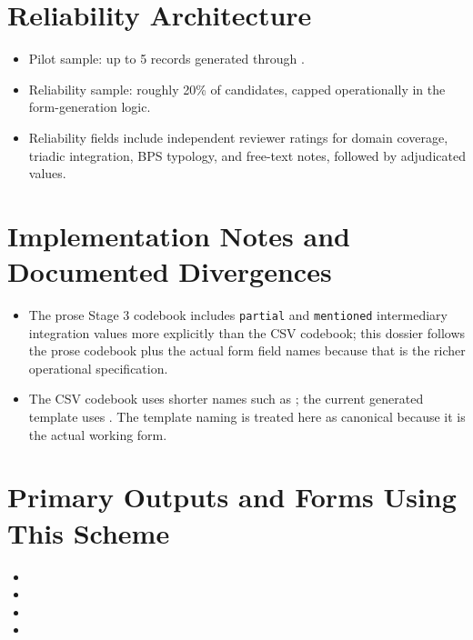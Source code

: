 \documentclass[11pt]{article}
\begin{document}
\section*{Reliability Architecture}
\begin{itemize}
\item Pilot sample: up to 5 records generated through .
\item Reliability sample: roughly 20\% of candidates, capped operationally in the form-generation logic.
\item Reliability fields include independent reviewer ratings for domain coverage, triadic integration, BPS typology, and free-text notes, followed by adjudicated values.
\end{itemize}

\section*{Implementation Notes and Documented Divergences}
\begin{itemize}
\item The prose Stage 3 codebook includes \texttt{partial} and \texttt{mentioned} intermediary integration values more explicitly than the CSV codebook; this dossier follows the prose codebook plus the actual form field names because that is the richer operational specification.
\item The CSV codebook uses shorter names such as ; the current generated template uses . The template naming is treated here as canonical because it is the actual working form.
\end{itemize}

\section*{Primary Outputs and Forms Using This Scheme}
\begin{itemize}
\item {}
\item {}
\item {}
\item {}
\end{itemize}
\end{document}
